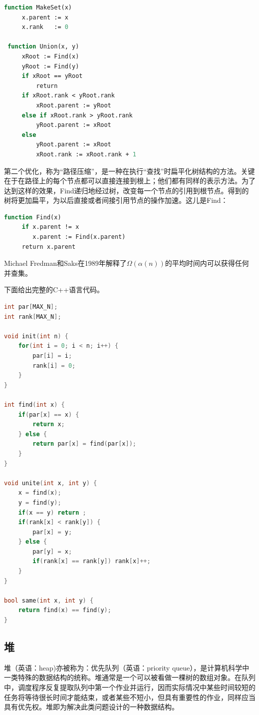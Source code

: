 \documentclass[a4paper]{article}
\begin{document}
\begin{CJK}{UTF8}{gbsn}
\begin{lstlisting}[language=pascal]
 function MakeSet(x)
     x.parent := x
     x.rank   := 0

 function Union(x, y)
     xRoot := Find(x)
     yRoot := Find(y)
     if xRoot == yRoot
         return
     if xRoot.rank < yRoot.rank
         xRoot.parent := yRoot
     else if xRoot.rank > yRoot.rank
         yRoot.parent := xRoot
     else
         yRoot.parent := xRoot
         xRoot.rank := xRoot.rank + 1
\end{lstlisting}

第二个优化，称为“路径压缩”，是一种在执行“查找”时扁平化树结构的方法。关键在于在路径上的每个节点都可以直接连接到根上；他们都有同样的表示方法。为了达到这样的效果，Find递归地经过树，改变每一个节点的引用到根节点。得到的树将更加扁平，为以后直接或者间接引用节点的操作加速。这儿是Find：
\begin{lstlisting}[language=pascal]
 function Find(x)
     if x.parent != x
        x.parent := Find(x.parent)
     return x.parent
\end{lstlisting}

Michael Fredman和Saks在1989年解释了$\Omega(\alpha(n))$的平均时间内可以获得任何并查集。

下面给出完整的C++语言代码。

\begin{lstlisting}[language=C++]
int par[MAX_N];
int rank[MAX_N];

void init(int n) {
    for(int i = 0; i < n; i++) {
        par[i] = i;
        rank[i] = 0;
    }
}

int find(int x) {
    if(par[x] == x) {
        return x;
    } else {
        return par[x] = find(par[x]);
    }
}

void unite(int x, int y) {
    x = find(x);
    y = find(y);
    if(x == y) return ;
    if(rank[x] < rank[y]) {
        par[x] = y;
    } else {
        par[y] = x;
        if(rank[x] == rank[y]) rank[x]++;
    }
}

bool same(int x, int y) {
    return find(x) == find(y);
}
\end{lstlisting}

\subsection{堆}

堆（英语：heap)亦被称为：优先队列（英语：priority queue），是计算机科学中一类特殊的数据结构的统称。堆通常是一个可以被看做一棵树的数组对象。在队列中，调度程序反复提取队列中第一个作业并运行，因而实际情况中某些时间较短的任务将等待很长时间才能结束，或者某些不短小，但具有重要性的作业，同样应当具有优先权。堆即为解决此类问题设计的一种数据结构。\cite{shaffer}


\end{CJK}
\end{document}
